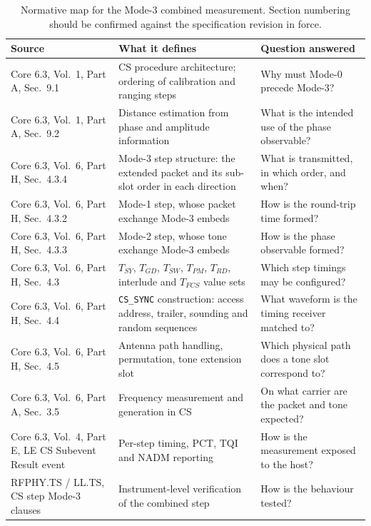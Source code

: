 \documentclass[11pt,a4paper]{article}
\newcommand{\PCT}{\mathrm{PCT}}
\newcommand{\TQI}{\mathrm{TQI}}
\newcommand{\NADM}{\mathrm{NADM}}
\newcommand{\Tsy}{T_{SY}}
\newcommand{\Tgd}{T_{GD}}
\newcommand{\Tsw}{T_{SW}}
\newcommand{\Tpm}{T_{PM}}
\newcommand{\Trd}{T_{RD}}
\newcommand{\code}[1]{\texttt{\small #1}}
\begin{document}
\begin{table}[h]
\caption{Normative map for the Mode-3 combined measurement. Section numbering should be confirmed
against the specification revision in force.}
\label{tab:normmap}
\centering\small
\begin{tabular}{@{}L{42mm}L{51mm}L{51mm}@{}}
\toprule
Source & What it defines & Question answered \\
\midrule
Core 6.3, Vol.\ 1, Part A, Sec.\ 9.1 & CS procedure architecture; ordering of calibration and ranging steps & Why must Mode-0 precede Mode-3? \\
Core 6.3, Vol.\ 1, Part A, Sec.\ 9.2 & Distance estimation from phase and amplitude information & What is the intended use of the phase observable? \\
Core 6.3, Vol.\ 6, Part H, Sec.\ 4.3.4 & Mode-3 step structure: the extended packet and its sub-slot order in each direction & What is transmitted, in which order, and when? \\
Core 6.3, Vol.\ 6, Part H, Sec.\ 4.3.2 & Mode-1 step, whose packet exchange Mode-3 embeds & How is the round-trip time formed? \\
Core 6.3, Vol.\ 6, Part H, Sec.\ 4.3.3 & Mode-2 step, whose tone exchange Mode-3 embeds & How is the phase observable formed? \\
Core 6.3, Vol.\ 6, Part H, Sec.\ 4.3 & $\Tsy$, $\Tgd$, $\Tsw$, $\Tpm$, $\Trd$, interlude and $T_{FCS}$ value sets & Which step timings may be configured? \\
Core 6.3, Vol.\ 6, Part H, Sec.\ 4.4 & \code{CS\_SYNC} construction: access address, trailer, sounding and random sequences & What waveform is the timing receiver matched to? \\
Core 6.3, Vol.\ 6, Part H, Sec.\ 4.5 & Antenna path handling, permutation, tone extension slot & Which physical path does a tone slot correspond to? \\
Core 6.3, Vol.\ 6, Part A, Sec.\ 3.5 & Frequency measurement and generation in CS & On what carrier are the packet and tone expected? \\
Core 6.3, Vol.\ 4, Part E, LE CS Subevent Result event & Per-step timing, $\PCT$, $\TQI$ and $\NADM$ reporting & How is the measurement exposed to the host? \\
RFPHY.TS / LL.TS, CS step Mode-3 clauses & Instrument-level verification of the combined step & How is the behaviour tested? \\
\bottomrule
\end{tabular}
\end{table}
\end{document}
